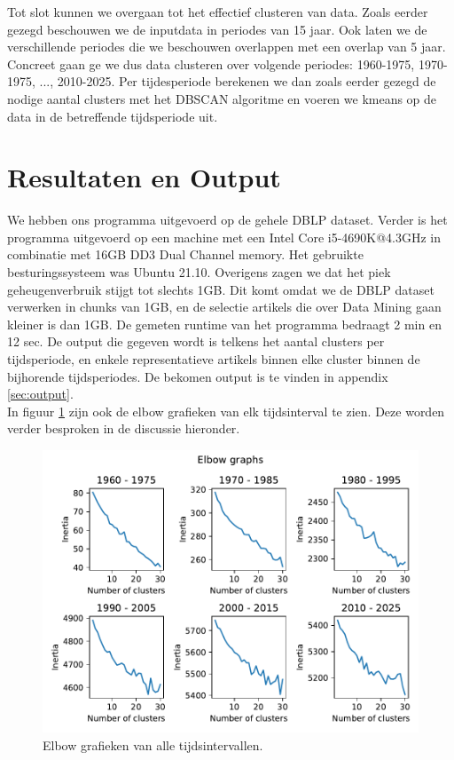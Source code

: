 \documentclass[a4paper,fontsize=11pt]{article}
\begin{document}
Tot slot kunnen we overgaan tot het effectief clusteren van data. Zoals eerder gezegd beschouwen we de inputdata in periodes van 15 jaar. Ook laten we de verschillende periodes die we beschouwen overlappen met een overlap van 5 jaar. Concreet gaan ge we dus data clusteren over volgende periodes: 1960-1975, 1970-1975, ..., 2010-2025. Per tijdesperiode berekenen we dan zoals eerder gezegd de nodige aantal clusters met het DBSCAN algoritme en voeren we kmeans op de data in de betreffende tijdsperiode uit. 

\section{Resultaten en Output}

We hebben ons programma uitgevoerd op de gehele DBLP dataset. Verder is het programma uitgevoerd op een machine met een Intel Core i5-4690K@4.3GHz in combinatie met 16GB DD3 Dual Channel memory. Het gebruikte besturingssysteem was Ubuntu 21.10. Overigens zagen we dat het piek geheugenverbruik stijgt tot slechts 1GB. Dit komt omdat we de DBLP dataset verwerken in chunks van 1GB, en de selectie artikels die over Data Mining gaan kleiner is dan 1GB. De gemeten runtime van het programma bedraagt 2 min en 12 sec. De output die gegeven wordt is telkens het aantal clusters per tijdsperiode, en enkele representatieve artikels binnen elke cluster binnen de bijhorende tijdsperiodes. De bekomen output is te vinden in appendix \ref{sec:output}. \\

In figuur \ref{fig:elbow} zijn ook de elbow grafieken van elk tijdsinterval te zien. Deze worden verder besproken in de discussie hieronder.

\begin{figure}[H]
  \centering
  \includegraphics[width=\textwidth]{elbow.pdf}
  \caption{Elbow grafieken van alle tijdsintervallen.}
  \label{fig:elbow}
\end{figure}
\end{document}
